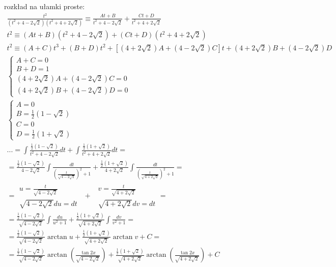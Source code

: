rozkład na ułamki proste:
\begin{gather*}\nonumber \frac{t^2}{(t^2+4-2\sqrt{2})(t^2+4+2\sqrt{2})} \equiv \frac{At+B}{t^2+4-2\sqrt{2}}+\frac{Ct+D}{t^2+4+2\sqrt{2}} \\
t^2 \equiv (At+B)(t^2+4-2\sqrt{2})+(Ct+D)(t^2+4+2\sqrt{2}) \\
t^2 \equiv (A+C)t^3+(B+D)t^2+[(4+2\sqrt{2})A+(4-2\sqrt{2})C]t+(4+2\sqrt{2})B+(4-2\sqrt{2})D \\
\begin{cases} A+C=0 \\ B+D=1 \\ (4+2\sqrt{2})A+(4-2\sqrt{2})C=0 \\ (4+2\sqrt{2})B+(4-2\sqrt{2})D=0 \end{cases} \\
\begin{cases} A=0 \\ B=\frac{1}{2}(1-\sqrt{2}) \\ C=0 \\ D=\frac{1}{2}(1+\sqrt{2}) \end{cases} \\
... = \int \frac{\frac{1}{2}(1-\sqrt{2})}{t^2+4-2\sqrt{2}}dt + \int \frac{\frac{1}{2}(1+\sqrt{2})}{t^2+4+2\sqrt{2}}dt =  \\
= \frac{\frac{1}{2}(1-\sqrt{2})}{4-2\sqrt{2}} \int \frac{dt}{(\frac{t}{\sqrt{4-2\sqrt{2}}})^2+1} + \frac{\frac{1}{2}(1+\sqrt{2})}{4+2\sqrt{2}} \int \frac{dt}{(\frac{t}{\sqrt{4+2\sqrt{2}}})^2+1} = \\
= \begin{array}{|l|} u=\frac{t}{\sqrt{4-2\sqrt{2}}} \\ \sqrt{4-2\sqrt{2}}du=dt \end{array} \ \ + \ \ \begin{array}{|l|} v=\frac{t}{\sqrt{4+2\sqrt{2}}} \\ \sqrt{4+2\sqrt{2}}dv=dt \end{array} = \\= \frac{\frac{1}{2}(1-\sqrt{2})}{\sqrt{4-2\sqrt{2}}} \int \frac{du}{u^2+1} + \frac{\frac{1}{2}(1+\sqrt{2})}{\sqrt{4+2\sqrt{2}}} \int \frac{dv}{v^2+1} =  \\
= \frac{\frac{1}{2}(1-\sqrt{2})}{\sqrt{4-2\sqrt{2}}} \arctan u + \frac{\frac{1}{2}(1+\sqrt{2})}{\sqrt{4+2\sqrt{2}}} \arctan v + C =  \\
= \frac{\frac{1}{2}(1-\sqrt{2})}{\sqrt{4-2\sqrt{2}}}  \arctan \left(\frac{\tan 2x}{\sqrt{4-2\sqrt{2}}}\right) + \frac{\frac{1}{2}(1+\sqrt{2})}{\sqrt{4+2\sqrt{2}}} \arctan \left(\frac{\tan 2x}{\sqrt{4+2\sqrt{2}}}\right) + C\end{gather*}


